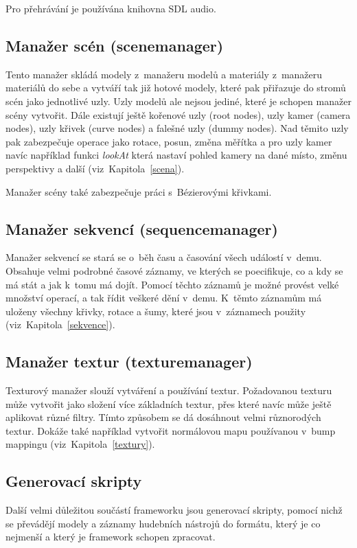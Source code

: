 Pro přehrávání je používána knihovna SDL audio.

\subsection{Manažer scén (scenemanager)} \label{scenaKratke}
Tento manažer skládá modely z~manažeru modelů a materiály z~manažeru materiálů do sebe a vytváří tak již hotové modely, které pak přiřazuje do stromů scén jako jednotlivé uzly.
Uzly modelů ale nejsou jediné, které je schopen manažer scény vytvořit.
Dále existují ještě kořenové uzly (root nodes), uzly kamer (camera nodes), uzly křivek (curve nodes) a falešné uzly (dummy nodes).
Nad těmito uzly pak zabezpečuje operace jako rotace, posun, změna měřítka a pro uzly kamer navíc například funkci \emph{lookAt} která nastaví pohled kamery na dané místo, změnu perspektivy a další (viz~Kapitola~\ref{scena}).

Manažer scény také zabezpečuje práci s~Bézierovými křivkami.

\subsection{Manažer sekvencí (sequencemanager)}
Manažer sekvencí se stará se o~běh času a časování všech událostí v~demu. Obsahuje velmi podrobné časové záznamy, ve kterých se poecifikuje, co a kdy se má stát a jak k~tomu má dojít. Pomocí těchto záznamů je možné provést velké množství operací, a tak řídit veškeré dění v~demu.
K~těmto záznamům má uloženy všechny křivky, rotace a šumy, které jsou v~záznamech použity (viz~Kapitola~\ref{sekvence}).

\subsection{Manažer textur (texturemanager)} \label{texturemanager}
Texturový manažer slouží vytváření a používání textur. Požadovanou texturu může vytvořit jako složení více základních textur, přes které navíc může ještě aplikovat různé filtry.
Tímto způsobem se dá dosáhnout velmi různorodých textur. 
Dokáže také například vytvořit normálovou mapu používanou v~bump mappingu (viz~Kapitola~\ref{textury}).

\subsection{Generovací skripty}
Další velmi důležitou součástí frameworku jsou generovací skripty, pomocí nichž se převádějí modely a záznamy hudebních nástrojů do formátu, který je co nejmenší a který je framework schopen zpracovat.

